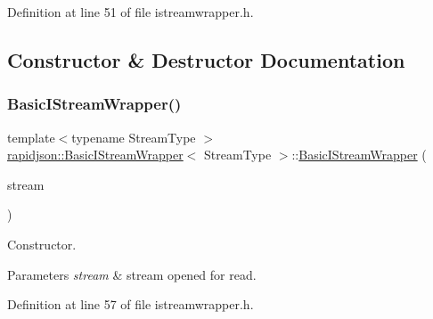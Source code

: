 Definition at line 51 of file istreamwrapper.\+h.



\subsection{Constructor \& Destructor Documentation}
\mbox{\label{classrapidjson_1_1_basic_i_stream_wrapper_a2b4e069522fa9119685f1cee836e5cfa}} 
\subsubsection{\texorpdfstring{BasicIStreamWrapper()}{BasicIStreamWrapper()}\hspace{0.1cm}{\footnotesize\ttfamily [1/4]}}
{\footnotesize\ttfamily template$<$typename Stream\+Type $>$ \\
\mbox{\hyperlink{classrapidjson_1_1_basic_i_stream_wrapper}{rapidjson\+::\+Basic\+I\+Stream\+Wrapper}}$<$ Stream\+Type $>$\+::\mbox{\hyperlink{classrapidjson_1_1_basic_i_stream_wrapper}{Basic\+I\+Stream\+Wrapper}} (\begin{DoxyParamCaption}\item[{Stream\+Type \&}]{stream }\end{DoxyParamCaption})}



Constructor. 


\begin{DoxyParams}{Parameters}
{\em stream} & stream opened for read. \\
\hline
\end{DoxyParams}


Definition at line 57 of file istreamwrapper.\+h.


